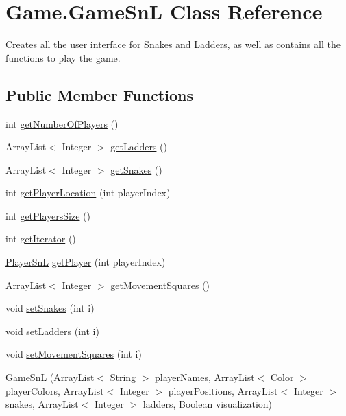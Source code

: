 \hypertarget{class_game_1_1_game_sn_l}{}\section{Game.\+Game\+Sn\+L Class Reference}
\label{class_game_1_1_game_sn_l}


Creates all the user interface for Snakes and Ladders, as well as contains all the functions to play the game.  


\subsection*{Public Member Functions}
\begin{DoxyCompactItemize}
\item 
int \hyperlink{class_game_1_1_game_sn_l_a7dc9a794ee67fda75110c95f37927bfd}{get\+Number\+Of\+Players} ()
\item 
Array\+List$<$ Integer $>$ \hyperlink{class_game_1_1_game_sn_l_a6b0635ee59d9a41d6d99d46c2695ac1d}{get\+Ladders} ()
\item 
Array\+List$<$ Integer $>$ \hyperlink{class_game_1_1_game_sn_l_a22041d671d2441ef54db03691e0005f8}{get\+Snakes} ()
\item 
int \hyperlink{class_game_1_1_game_sn_l_a3be79ab2fef3a95a5225df2c070ded0f}{get\+Player\+Location} (int player\+Index)
\item 
int \hyperlink{class_game_1_1_game_sn_l_aeee36f69ce6b0181699985b4f8f33804}{get\+Players\+Size} ()
\item 
int \hyperlink{class_game_1_1_game_sn_l_a17f7962bedb5c8342429d9193fda4109}{get\+Iterator} ()
\item 
\hyperlink{class_player_1_1_player_sn_l}{Player\+Sn\+L} \hyperlink{class_game_1_1_game_sn_l_a076667f8879f4028f32f7b6e9a12a56e}{get\+Player} (int player\+Index)
\item 
Array\+List$<$ Integer $>$ \hyperlink{class_game_1_1_game_sn_l_a3039b9412740fd591db9adf56d1e27e2}{get\+Movement\+Squares} ()
\item 
void \hyperlink{class_game_1_1_game_sn_l_af55a1bc816074728dd65958c30929374}{set\+Snakes} (int i)
\item 
void \hyperlink{class_game_1_1_game_sn_l_a08b5522b146d49dcef3c4b3a477314ee}{set\+Ladders} (int i)
\item 
void \hyperlink{class_game_1_1_game_sn_l_a4b111f57d294bb007201657c20cf6938}{set\+Movement\+Squares} (int i)
\item 
\hyperlink{class_game_1_1_game_sn_l_a76663e6331e7f09bdb0baaf6d3f28b2f}{Game\+Sn\+L} (Array\+List$<$ String $>$ player\+Names, Array\+List$<$ Color $>$ player\+Colors, Array\+List$<$ Integer $>$ player\+Positions, Array\+List$<$ Integer $>$ snakes, Array\+List$<$ Integer $>$ ladders, Boolean visualization)

\end{DoxyCompactItemize}

